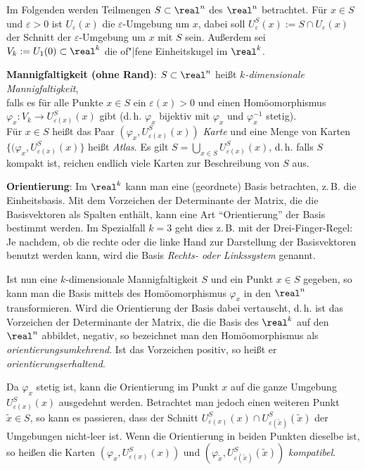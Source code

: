 Im Folgenden werden Teilmengen $S \subset \real^n$ des $\real^n$ betrachtet.
Für $x \in S$ und $\varepsilon > 0$ ist $U_\varepsilon(x)$ die
$\varepsilon$-Umgebung um $x$, dabei soll
$U_\varepsilon^S(x) := S \cap U_\varepsilon(x)$ der Schnitt
der $\varepsilon$-Umgebung um $x$ mit $S$ sein.
Außerdem sei $V_k := U_1(0) \subset \real^k$ die of"|fene Einheitskugel
im $\real^k$.

\textbf{Mannigfaltigkeit (ohne Rand)}:
$S \subset \real^n$ heißt \emph{$k$-dimensionale Mannigfaltigkeit}, \\
falls es für alle Punkte $x \in S$ ein $\varepsilon(x) > 0$ und einen
Homöomorphismus $\varphi_x\colon V_k \rightarrow U_{\varepsilon(x)}^S(x)$ gibt
(d.\,h. $\varphi_x$ bijektiv mit $\varphi_x$ und $\varphi_x^{-1}$ stetig). \\
Für $x \in S$ heißt das Paar $(\varphi_x, U_{\varepsilon(x)}^S(x))$
\emph{Karte} und eine Menge von Karten
$\{(\varphi_x, U_{\varepsilon(x)}^S(x)\}$ heißt \emph{Atlas}.
Es gilt $S = \bigcup_{x \in S} U_{\varepsilon(x)}^S(x)$, d.\,h. falls
$S$ kompakt ist, reichen endlich viele Karten zur Beschreibung von $S$ aus.

\linie

\textbf{Orientierung}:
Im $\real^k$ kann man eine (geordnete)
Basis betrachten, z.\,B. die Einheitsbasis.
Mit dem Vorzeichen der Determinante der Matrix,
die die Basisvektoren als Spalten enthält,
kann eine Art "`Orientierung"' der Basis bestimmt werden.
Im Spezialfall $k = 3$ geht dies z.\,B. mit der Drei-Finger-Regel:
Je nachdem, ob die rechte oder die linke Hand zur Darstellung der Basisvektoren
benutzt werden kann, wird die Basis \emph{Rechts- oder Linkssystem} genannt.

Ist nun eine $k$-dimensionale Mannigfaltigkeit $S$ und ein Punkt $x \in S$
gegeben, so kann man die Basis mittels des Homöomorphismus $\varphi_x$
in den $\real^n$ transformieren.
Wird die Orientierung der Basis dabei vertauscht, d.\,h.
ist das Vorzeichen der Determinante der Matrix, die die Basis des $\real^k$
auf den $\real^n$ abbildet, negativ, so bezeichnet man den Homöomorphismus
als \emph{orientierungsumkehrend}.
Ist das Vorzeichen positiv, so heißt er \emph{orientierungserhaltend}.

Da $\varphi_x$ stetig ist, kann die Orientierung im Punkt $x$ auf die
ganze Umgebung $U_{\varepsilon(x)}^S(x)$ ausgedehnt werden.
Betrachtet man jedoch einen weiteren Punkt $\widetilde{x} \in S$, so kann es
passieren, dass der Schnitt $U_{\varepsilon(x)}^S(x) \cap
U_{\varepsilon(\widetilde{x})}^S(\widetilde{x})$ der Umgebungen nicht-leer ist.
Wenn die Orientierung in beiden Punkten dieselbe ist, so heißen die Karten
$(\varphi_x, U_{\varepsilon(x)}^S(x))$ und
$(\varphi_{\widetilde{x}}, U_{\varepsilon(\widetilde{x})}^S(\widetilde{x}))$
\emph{kompatibel}.

